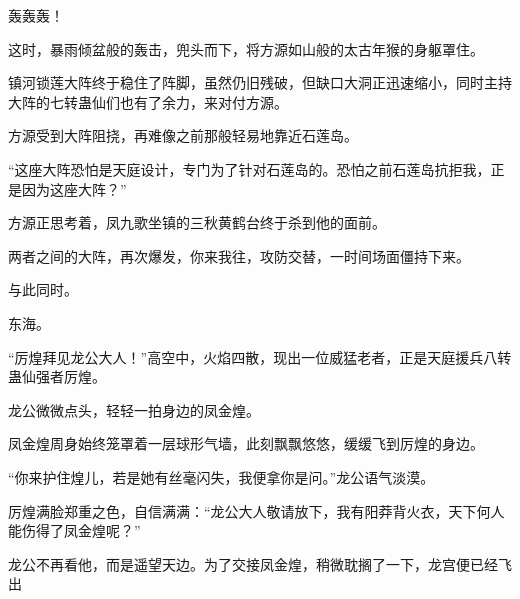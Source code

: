 \begin{this_body}
轰轰轰！

这时，暴雨倾盆般的轰击，兜头而下，将方源如山般的太古年猴的身躯罩住。

镇河锁莲大阵终于稳住了阵脚，虽然仍旧残破，但缺口大洞正迅速缩小，同时主持大阵的七转蛊仙们也有了余力，来对付方源。

方源受到大阵阻挠，再难像之前那般轻易地靠近石莲岛。

“这座大阵恐怕是天庭设计，专门为了针对石莲岛的。恐怕之前石莲岛抗拒我，正是因为这座大阵？”

方源正思考着，凤九歌坐镇的三秋黄鹤台终于杀到他的面前。

两者之间的大阵，再次爆发，你来我往，攻防交替，一时间场面僵持下来。

与此同时。

东海。

“厉煌拜见龙公大人！”高空中，火焰四散，现出一位威猛老者，正是天庭援兵八转蛊仙强者厉煌。

龙公微微点头，轻轻一拍身边的凤金煌。

凤金煌周身始终笼罩着一层球形气墙，此刻飘飘悠悠，缓缓飞到厉煌的身边。

“你来护住煌儿，若是她有丝毫闪失，我便拿你是问。”龙公语气淡漠。

厉煌满脸郑重之色，自信满满：“龙公大人敬请放下，我有阳莽背火衣，天下何人能伤得了凤金煌呢？”

龙公不再看他，而是遥望天边。为了交接凤金煌，稍微耽搁了一下，龙宫便已经飞出

\end{this_body}

